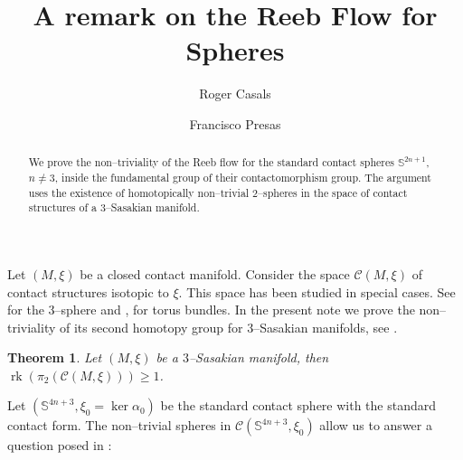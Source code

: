 \documentclass[10pt]{amsart}
\newtheorem{theorem}[proposition]{Theorem}
\begin{document}
\title{A remark on the Reeb Flow for Spheres}



\author{Roger Casals}
\address{Instituto de Ciencias Matem\'aticas -- CSIC.
C. Nicol\'as Cabrera, 13--15, 28049, Madrid, Spain.}

\author{Francisco Presas}
\address{Instituto de Ciencias Matem\'aticas -- CSIC.
C. Nicol\'as Cabrera, 13--15, 28049, Madrid, Spain.}

\begin{abstract}
We prove the non--triviality of the Reeb flow for the standard contact spheres ${\mathbb{S}}^{2n+1}$, $n\neq3$, inside the fundamental group of their contactomorphism group. The argument uses the existence of homotopically non--trivial $2$--spheres in the space of contact structures of a $3$--Sasakian manifold. 
\end{abstract}
\maketitle

\noindent Let $(M,\xi)$ be a closed contact manifold. Consider the space ${\mathcal{C}}(M,\xi)$ of contact structures isotopic to $\xi$. This space has been studied in special cases. See \cite{El} for the $3$--sphere and \cite{Bo}, \cite{Ge} for torus bundles. In the present note we prove the non--triviality of its second homotopy group for $3$--Sasakian manifolds, see \cite{BG}. 
\begin{theorem}\label{thm:lin}
Let $(M,\xi)$ be a $3$--Sasakian manifold, then ${\operatorname{rk}}(\pi_2({\mathcal{C}}(M,\xi)))\geq1$.
\end{theorem}
\noindent Let $({\mathbb{S}}^{4n+3},\xi_0=\ker\alpha_0)$ be the standard contact sphere with the standard contact form. The non--trivial spheres in ${\mathcal{C}}({\mathbb{S}}^{4n+3},\xi_0)$ allow us to answer a question posed in \cite{Gi}:\\

\\
\end{document}
